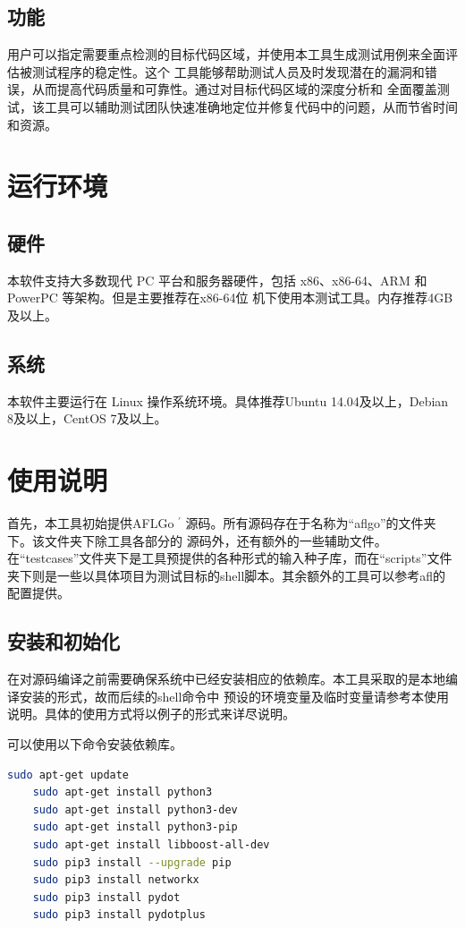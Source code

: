 \documentclass[bachelor]{njupthesis}
\begin{document}
\subsection{功能}
用户可以指定需要重点检测的目标代码区域，并使用本工具生成测试用例来全面评估被测试程序的稳定性。这个
工具能够帮助测试人员及时发现潜在的漏洞和错误，从而提高代码质量和可靠性。通过对目标代码区域的深度分析和
全面覆盖测试，该工具可以辅助测试团队快速准确地定位并修复代码中的问题，从而节省时间和资源。
\section{运行环境}
\subsection{硬件}
本软件支持大多数现代 PC 平台和服务器硬件，包括 x86、x86-64、ARM 和 PowerPC 等架构。但是主要推荐在x86-64位
机下使用本测试工具。内存推荐4GB及以上。
\subsection{系统}
本软件主要运行在 Linux 操作系统环境。具体推荐Ubuntu 14.04及以上，Debian 8及以上，CentOS 7及以上。
\section{使用说明}
首先，本工具初始提供AFLGo $^\prime$ 源码。所有源码存在于名称为“aflgo”的文件夹下。该文件夹下除工具各部分的
源码外，还有额外的一些辅助文件。在“testcases”文件夹下是工具预提供的各种形式的输入种子库，而在“scripts”文件
夹下则是一些以具体项目为测试目标的shell脚本。其余额外的工具可以参考afl的配置提供。
\subsection{安装和初始化}
在对源码编译之前需要确保系统中已经安装相应的依赖库。本工具采取的是本地编译安装的形式，故而后续的shell命令中
预设的环境变量及临时变量请参考本使用说明。具体的使用方式将以例子的形式来详尽说明。

可以使用以下命令安装依赖库。
\begin{lstlisting}[language=bash]
	sudo apt-get update
	sudo apt-get install python3
	sudo apt-get install python3-dev
	sudo apt-get install python3-pip
	sudo apt-get install libboost-all-dev 
	sudo pip3 install --upgrade pip
	sudo pip3 install networkx
	sudo pip3 install pydot
	sudo pip3 install pydotplus
\end{lstlisting}
\end{document}
